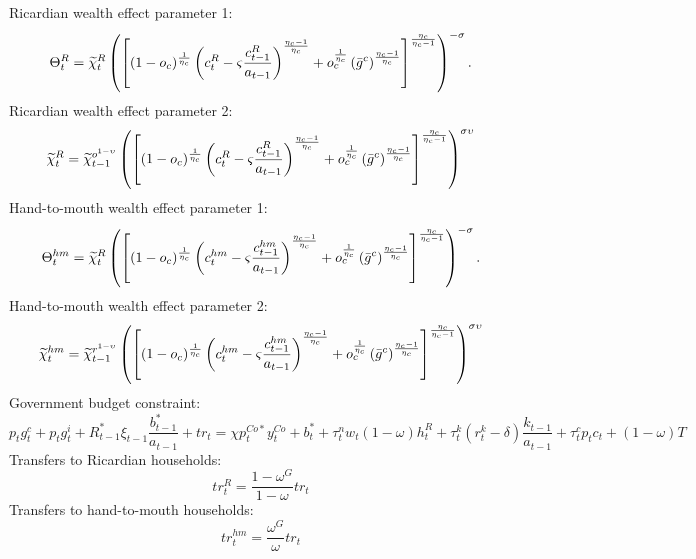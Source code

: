 \documentclass[12pt]{article}
\begin{document}
Ricardian wealth effect parameter 1:
\begin{equation}
\Theta^R _{t}=\widetilde{\chi }_{t}^R\left(\left[(1-o_c)^{\frac{1}{\eta_c}}\left(c^R_{t}-\varsigma \frac{c^R_{t-1}}{%
a_{t-1}}\right)^{\frac{\eta_c - 1}{\eta_c}} + o_c^{\frac{1}{\eta_c}}\left(\bar{g}^c\right)^{\frac{\eta_c -1}{\eta_c}}\right]^{\frac{\eta_c}{\eta_c -1}}\right)^{-\sigma}.  \label{eq:EE_30}
\end{equation}%
Ricardian wealth effect parameter 2:
\begin{equation}
\widetilde{\chi }_{t}^R=\widetilde{\chi }_{t-1}^{o^{1-\upsilon} }\left(\left[(1-o_c)^{\frac{1}{\eta_c}}\left(c^R_{t}-\varsigma \frac{c^R_{t-1}}{%
a_{t-1}}\right)^{\frac{\eta_c - 1}{\eta_c}} + o_c^{\frac{1}{\eta_c}}\left(\bar{g}^c\right)^{\frac{\eta_c -1}{\eta_c}}\right]^{\frac{\eta_c}{\eta_c -1}}\right)^{\sigma \upsilon }
\label{eq:EE_31}
\end{equation}
Hand-to-mouth wealth effect parameter 1:
\begin{equation}
\Theta^{hm} _{t}=\widetilde{\chi }_{t}^R\left(\left[(1-o_c)^{\frac{1}{\eta_c}}\left(c^{hm}_{t}-\varsigma \frac{c^{hm}_{t-1}}{%
a_{t-1}}\right)^{\frac{\eta_c - 1}{\eta_c}} + o_c^{\frac{1}{\eta_c}}\left(\bar{g}^c\right)^{\frac{\eta_c -1}{\eta_c}}\right]^{\frac{\eta_c}{\eta_c -1}}\right)^{-\sigma}.  \label{eq:EE_32}
\end{equation}%
Hand-to-mouth wealth effect parameter 2:
\begin{equation}
\widetilde{\chi }_{t}^{hm}=\widetilde{\chi }_{t-1}^{r^{1-\upsilon} }\left(\left[(1-o_c)^{\frac{1}{\eta_c}}\left(c^{hm}_{t}-\varsigma \frac{c^{hm}_{t-1}}{%
a_{t-1}}\right)^{\frac{\eta_c - 1}{\eta_c}} + o_c^{\frac{1}{\eta_c}}\left(\bar{g}^c\right)^{\frac{\eta_c -1}{\eta_c}}\right]^{\frac{\eta_c}{\eta_c -1}}\right)^{\sigma \upsilon }
\label{eq:EE_33}
\end{equation}%
Government budget constraint:
\begin{equation}
p_t g^c_{t} + p_tg^i_{t} +R_{t-1}^*\xi_{t-1}\frac{b^*_{t-1}}{a_{t-1}} + tr_t = \chi p_t^{Co*}y_t^{Co}+b_t^* + \tau_t^n w_t (1-\omega)h_t^R + \tau_t^k (r_t^k-\delta)\frac{k_{t-1}}{a_{t-1}} + \tau_t^c p_t c_t + (1-\omega)T
\label{eq:EE_34}
\end{equation}%
Transfers to Ricardian households:
\begin{equation}
tr_t^R = \frac{1-\omega^G}{1-\omega}tr_t  
\label{eq:EE_35}
\end{equation}
Transfers to hand-to-mouth households:
\begin{equation}
tr_t^{hm} = \frac{\omega^G}{\omega}tr_t  
\label{eq:EE_36}
\end{equation}
\end{document}
